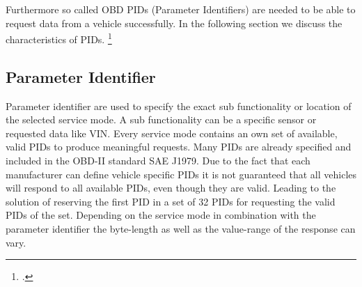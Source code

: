 Furthermore so called OBD PIDs (Parameter Identifiers) are needed to be able to request data from a vehicle successfully. In the following section 
we discuss the characteristics of PIDs. \footcite{SCHAFOBD1}

\subsection{Parameter Identifier}
Parameter identifier are used to specify the exact sub functionality or location of the selected service mode. A sub functionality can
be a specific sensor or requested data like VIN. Every service mode contains an own set of available, valid PIDs to produce meaningful requests. Many PIDs are 
already specified and included in the OBD-II standard SAE J1979. Due to the fact that each manufacturer can define vehicle specific PIDs it is not 
guaranteed that all vehicles will respond to all available PIDs, even though they are valid. Leading to the solution of reserving the first PID in a 
set of 32 PIDs for requesting the valid PIDs of the set. Depending on the service mode in combination with the parameter identifier the byte-length 
as well as the value-range of the response can vary. 


